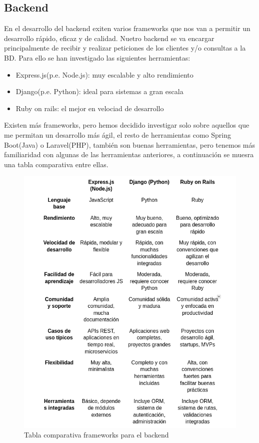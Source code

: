 \subsection{Backend}
En el desarrollo del backend exiten varios frameworks que nos van a permitir un desarrollo rápido, eficaz y de calidad. Nuetro backend se va encargar principalmente de recibir y realizar peticiones de los clientes y/o consultas a la BD. Para ello se han investigado las siguientes herramientas:
\begin{itemize}
	\item Express.js(p.e. Node.js): muy escalable y alto rendimiento
	\item Django(p.e. Python): ideal para sistemas a gran escala
	\item Ruby on rails: el mejor en velociad de desarrollo
\end{itemize}
Existen más frameworks, pero hemos decidido investigar solo sobre aquellos que me permitan un desarrollo más ágil, el resto de herramientas como Spring Boot(Java) o Laravel(PHP), también son buenas herramientas, pero tenemos más familiaridad con algunas de las herramientas anteriores, a continuación se muesra una tabla comparativa entre ellas.

\newpage

\begin{figure}[H]
   \centering
    \includegraphics[width=\textwidth]{tablas/Backend.png}
    \caption{Tabla comparativa frameworks para el backend}
    \label{fig:Tabla backend}
\end{figure}

